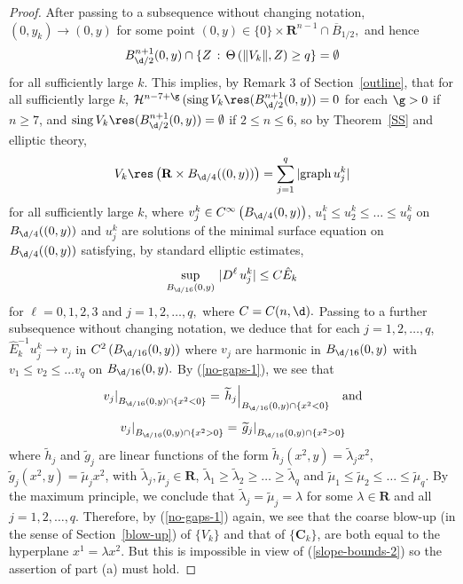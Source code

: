 \documentclass[a4paper,11pt]{amsart}
\begin{document}
\begin{proof}
After passing to a subsequence without changing notation, $(0, y_{k}) \to (0, y)$ for some point 
$(0, y) \in \{0\} \times {\mathbf R}^{n-1} \cap {\overline B_{1/2}},$ and hence
$$B^{n+1}_{\d/2}(0,y) \cap \{Z \, : \, \Theta \, (\|V_{k}\|, Z) \geq q\} = \emptyset$$ 
for all sufficiently large $k$.
This implies, by Remark 3 of Section~\ref{outline}, that for all sufficiently large $k$,
${\mathcal H}^{n-7+\g} \, ({\rm sing} \, V_{k}\res(B_{\d/2}^{n+1}(0, y)) = 0$ for each $\g >0$ if 
$n \geq 7$, and ${\rm sing} \, V_{k}\res (B_{\d/2}^{n+1}(0,y)) = \emptyset$ if $2 \leq n \leq 6$, so by 
Theorem~\ref{SS} and elliptic theory,  
\begin{equation}\label{no-gaps-2}
V_{k} \res \left({\mathbf R} \times B_{\d/4}((0, y))\right)= \sum_{j=1}^{q} |{\rm graph} \, u_{j}^{k}|
\end{equation}
for all sufficiently large $k$, where $v_{j}^{k} \in C^{\infty}\left( B_{\d/4}(0, y)\right)$, $u_{1}^{k} \leq u_{2}^{k} \leq \ldots \leq u_{q}^{k}$ on $B_{\d/4}((0, y))$ and $u_{j}^{k}$ are solutions of the minimal surface equation on 
$ B_{\d/4}((0, y))$ satisfying, by 
standard elliptic estimates,
$$\sup_{B_{\d/16}(0,y)} \, |D^{\ell} \, u_{j}^{k}| \leq C{\hat E}_{k}$$ 
for $\ell =0, 1, 2, 3$ and 
$j=1, 2, \ldots, q,$ where $C = C(n, \d).$ Passing to a further subsequence without changing notation, 
we deduce that for each $j=1, 2, \ldots, q$, 
${\hat E}_{k}^{-1} u_{j}^{k}  \to v_{j}$ in $C^{2} \, (B_{\d/16}(0, y))$ where 
$v_{j}$ are harmonic in $B_{\d/16}(0, y)$ with $v_{1} \leq v_{2} \leq \ldots  v_{q}$ on $B_{\d/16}(0, y).$ By  (\ref{no-gaps-1}), we see that 
$$\left.v_{j} \right|_{B_{\d/16}(0, y) \cap \{x^{2} < 0\}} = \left.{\widetilde h_{j}}\right|_{B_{\d/16}(0, y) \cap \{x^{2} < 0\}} \;\;\; \mbox{and}$$ 
$$\left.v_{j} \right|_{B_{\d/16}(0, y) \cap \{x^{2} > 0\}} = \left.{\widetilde g_{j}}\right|_{B_{\d/16}(0, y) \cap \{x^{2} > 0\}}$$ 
where ${\widetilde h}_{j}$ and ${\widetilde g}_{j}$ are linear functions of the form 
${\widetilde h}_{j}(x^{2}, y) = \widetilde{\lambda}_{j} x^{2}$, $\widetilde{g}_{j}(x^{2}, y) = \widetilde{\mu}_{j}x^{2}$, 
with $\widetilde{\lambda}_{j}, \widetilde{\mu}_{j} \in {\mathbf R}$, 
$\widetilde{\lambda}_{1} \geq \widetilde{\lambda}_{2} \geq \ldots \geq \widetilde{\lambda}_{q}$ and 
$\widetilde{\mu}_{1} \leq \widetilde{\mu}_{2} \leq \ldots \leq \widetilde{\mu}_{q}.$ 
By the maximum principle, we conclude that $\widetilde{\lambda}_{j} =  \widetilde{\mu}_{j} = \lambda$ for some 
$\lambda \in {\mathbf R}$ and
all $j=1, 2, \ldots, q.$ Therefore, by (\ref{no-gaps-1}) again, we see that the coarse blow-up (in the sense of Section~\ref{blow-up}) of 
$\{V_{k}\}$ and that of $\{{\mathbf C}_{k}\}$, are both equal to the hyperplane $x^{1} = \lambda x^{2}.$ But this is impossible in view of (\ref{slope-bounds-2}) so the assertion of part (a)
must hold.


\end{proof}
\end{document}
